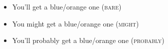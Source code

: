 \documentclass[man, floatsintext]{apa6}
\providecommand{\DIFdel}[1]{{\protect\color{red}\sout{#1}}}                      %
\providecommand{\DIFdelFL}[1]{\DIFdel{#1}} %
\providecommand{\DIFaddbeginFL}{} %
\providecommand{\DIFaddendFL}{} %
\providecommand{\DIFdelbeginFL}{} %
\providecommand{\DIFdelendFL}{} %
\newcommand{\DIFscaledelfig}{0.5}
\newlength{\DIFdelgraphicswidth} %
\newlength{\DIFdelgraphicsheight} %
\newcommand{\DIFaddincludegraphics}[2][]{{\color{blue}\fbox{\DIFOincludegraphics[#1]{#2}}}} %
\newcommand{\DIFdelincludegraphics}[2][]{%
\sbox{\DIFdelgraphicsbox}{\DIFOincludegraphics[#1]{#2}}%
\settoboxwidth{\DIFdelgraphicswidth}{\DIFdelgraphicsbox} %
\settoboxtotalheight{\DIFdelgraphicsheight}{\DIFdelgraphicsbox} %
\scalebox{\DIFscaledelfig}{%
\parbox[b]{\DIFdelgraphicswidth}{\usebox{\DIFdelgraphicsbox}\\[-\baselineskip] \rule{\DIFdelgraphicswidth}{0em}}\llap{\resizebox{\DIFdelgraphicswidth}{\DIFdelgraphicsheight}{%
\setlength{\unitlength}{\DIFdelgraphicswidth}%
\begin{picture}(1,1)%
\thicklines\linethickness{2pt} %
{\color[rgb]{1,0,0}\put(0,0){\framebox(1,1){}}}%
{\color[rgb]{1,0,0}\put(0,0){\line( 1,1){1}}}%
{\color[rgb]{1,0,0}\put(0,1){\line(1,-1){1}}}%
\end{picture}%
}\hspace*{3pt}}} %
} %
\DeclareRobustCommand{\DIFaddbeginFL}{\DIFOaddbeginFL \let\includegraphics\DIFaddincludegraphics} %
\DeclareRobustCommand{\DIFaddendFL}{\DIFOaddendFL \let\includegraphics\DIFOincludegraphics} %
\DeclareRobustCommand{\DIFdelbeginFL}{\DIFOdelbeginFL \let\includegraphics\DIFdelincludegraphics} %
\DeclareRobustCommand{\DIFdelendFL}{\DIFOaddendFL \let\includegraphics\DIFOincludegraphics} %
\begin{document}
\begin{itemize}
\item You'll get a blue/orange one (\textsc{bare})
\item You might get a blue/orange one (\textsc{might})
\item You'll probably get a blue/orange one (\textsc{probably})
\end{itemize}

\end{document}
